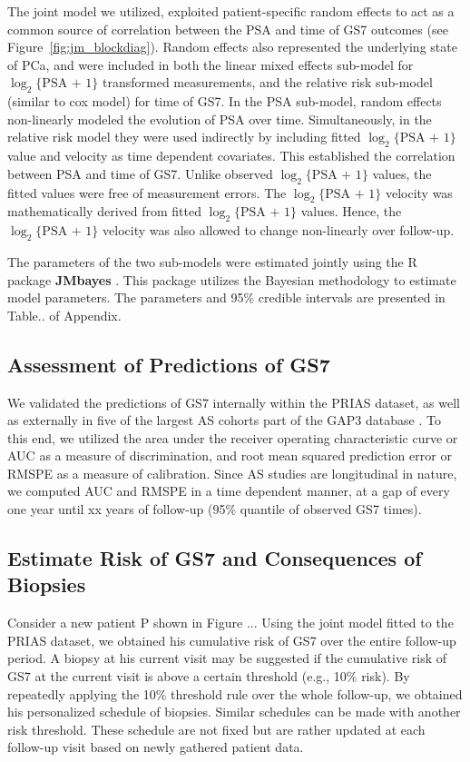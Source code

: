 The joint model we utilized, exploited patient-specific random effects \citep{laird1982random} to act as a common source of correlation between the PSA and time of GS7 outcomes (see Figure~\ref{fig:jm_blockdiag}). Random effects also represented the underlying state of PCa, and were included in both the linear mixed effects sub-model for $\log_2\{\mbox{PSA + 1}\}$ transformed measurements, and the relative risk sub-model (similar to cox model) for time of GS7. In the PSA sub-model, random effects non-linearly modeled the evolution of PSA over time. Simultaneously, in the relative risk model they were used indirectly by including fitted $\log_2\{\mbox{PSA + 1}\}$ value and velocity as time dependent covariates. This established the correlation between PSA and time of GS7. Unlike observed $\log_2\{\mbox{PSA + 1}\}$ values, the fitted values were free of measurement errors. The $\log_2\{\mbox{PSA + 1}\}$ velocity was mathematically derived from fitted $\log_2\{\mbox{PSA + 1}\}$ values. Hence, the $\log_2\{\mbox{PSA + 1}\}$ velocity was also allowed to change non-linearly over follow-up.

The parameters of the two sub-models were estimated jointly using the R package \textbf{JMbayes} \citep{rizopoulosJMbayes}. This package utilizes the Bayesian methodology to estimate model parameters. The parameters and 95\% credible intervals are presented in Table.. of Appendix.

\subsection{Assessment of Predictions of GS7}
We validated the predictions of GS7 internally within the PRIAS dataset, as well as externally in five of the largest AS cohorts part of the GAP3 database \citep{gap3_2018}. To this end, we utilized the area under the receiver operating characteristic curve or AUC \cite{rizopoulos2017dynamic} as a measure of discrimination, and root mean squared prediction error or RMSPE \cite{rizopoulos2017dynamic} as a measure of calibration. Since AS studies are longitudinal in nature, we computed AUC and RMSPE in a time dependent manner, at a gap of every one year until xx years of follow-up (95\% quantile of observed GS7 times).

\subsection{Estimate Risk of GS7 and Consequences of Biopsies}
Consider a new patient P shown in Figure ... Using the joint model fitted to the PRIAS dataset, we obtained his cumulative risk of GS7 over the entire follow-up period. A biopsy at his current visit may be suggested if the cumulative risk of GS7 at the current visit is above a certain threshold (e.g., 10\% risk). By repeatedly applying the 10\% threshold rule over the whole follow-up, we obtained his personalized schedule of biopsies. Similar schedules can be made with another risk threshold. These schedule are not fixed but are rather updated at each follow-up visit based on newly gathered patient data. 

